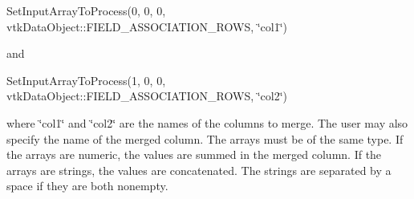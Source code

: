 Set\-Input\-Array\-To\-Process(0, 0, 0, vtk\-Data\-Object\-::\-F\-I\-E\-L\-D\-\_\-\-A\-S\-S\-O\-C\-I\-A\-T\-I\-O\-N\-\_\-\-R\-O\-W\-S, \char`\"{}col1\char`\"{})

and

Set\-Input\-Array\-To\-Process(1, 0, 0, vtk\-Data\-Object\-::\-F\-I\-E\-L\-D\-\_\-\-A\-S\-S\-O\-C\-I\-A\-T\-I\-O\-N\-\_\-\-R\-O\-W\-S, \char`\"{}col2\char`\"{})

where \char`\"{}col1\char`\"{} and \char`\"{}col2\char`\"{} are the names of the columns to merge. The user may also specify the name of the merged column. The arrays must be of the same type. If the arrays are numeric, the values are summed in the merged column. If the arrays are strings, the values are concatenated. The strings are separated by a space if they are both nonempty.

